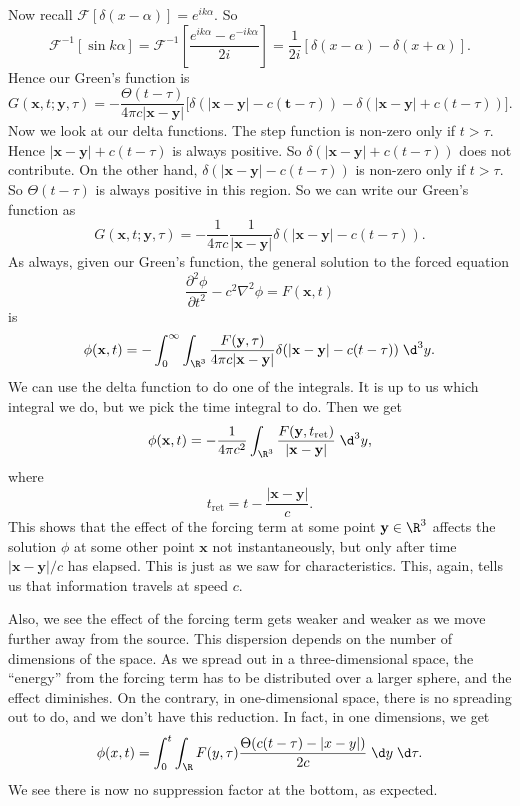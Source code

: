 \documentclass[a4paper]{article}
\begin{document}
Now recall $\mathcal{F}[\delta(x - \alpha)] = e^{ik\alpha}$. So
\[
  \mathcal{F}^{-1}[\sin k\alpha] = \mathcal{F}^{-1} \left[\frac{e^{ik\alpha} - e^{-ik\alpha}}{2 i}\right] = \frac{1}{2i} [\delta(x - \alpha) - \delta(x + \alpha)].
\]
Hence our Green's function is
\[
  G(\mathbf{x}, t; \mathbf{y}, \tau) = -\frac{\Theta(t - \tau)}{4\pi c |\mathbf{x} - \mathbf{y}|}\Big[\delta(|\mathbf{x} - \mathbf{y}| - c(\mathbf{t} - \tau)) - \delta(|\mathbf{x} - \mathbf{y}| + c(t - \tau))\Big].
\]
Now we look at our delta functions. The step function is non-zero only if $t > \tau$. Hence $|\mathbf{x} - \mathbf{y}| + c(t - \tau)$ is always positive. So $\delta(|\mathbf{x} - \mathbf{y}| + c(t - \tau))$ does not contribute. On the other hand, $\delta(|\mathbf{x} - \mathbf{y}| - c(t - \tau))$ is non-zero only if $t > \tau$. So $\Theta(t - \tau)$ is always positive in this region. So we can write our Green's function as
\[
  G(\mathbf{x}, t; \mathbf{y}, \tau) = -\frac{1}{4\pi c} \frac{1}{|\mathbf{x} - \mathbf{y}|} \delta(|\mathbf{x} - \mathbf{y}| - c(t - \tau)).
\]
As always, given our Green's function, the general solution to the forced equation
\[
  \frac{\partial^2 \phi}{\partial t^2} - c^2 \nabla^2 \phi = F(\mathbf{x}, t)
\]
is
\[
  \phi(\mathbf{x}, t) = -\int_0^\infty \int_{\R^3} \frac{F(\mathbf{y}, \tau)}{4\pi c|\mathbf{x} - \mathbf{y}|} \delta(|\mathbf{x} - \mathbf{y}| - c(t - \tau)) \;\d^3 y.
\]
We can use the delta function to do one of the integrals. It is up to us which integral we do, but we pick the time integral to do. Then we get
\[
  \phi(\mathbf{x}, t) = -\frac{1}{4\pi c^2} \int_{\R^3} \frac{F(\mathbf{y}, t_{\mathrm{ret}})}{|\mathbf{x} - \mathbf{y}|} \;\d^3 y,
\]
where
\[
  t_{\mathrm{ret}} = t - \frac{|\mathbf{x} - \mathbf{y}|}{c}.
\]
This shows that the effect of the forcing term at some point $\mathbf{y} \in \R^3$ affects the solution $\phi$ at some other point $\mathbf{x}$ not instantaneously, but only after time $|\mathbf{x} - \mathbf{y}|/c$ has elapsed. This is just as we saw for characteristics. This, again, tells us that information travels at speed $c$.

Also, we see the effect of the forcing term gets weaker and weaker as we move further away from the source. This dispersion depends on the number of dimensions of the space. As we spread out in a three-dimensional space, the ``energy'' from the forcing term has to be distributed over a larger sphere, and the effect diminishes. On the contrary, in one-dimensional space, there is no spreading out to do, and we don't have this reduction. In fact, in one dimensions, we get
\[
  \phi(x, t) = \int_0^t \int_\R F(y, \tau) \frac{\Theta(c(t - \tau) - |x - y|)}{2c} \;\d y \;\d \tau.
\]
We see there is now no suppression factor at the bottom, as expected.
\end{document}

